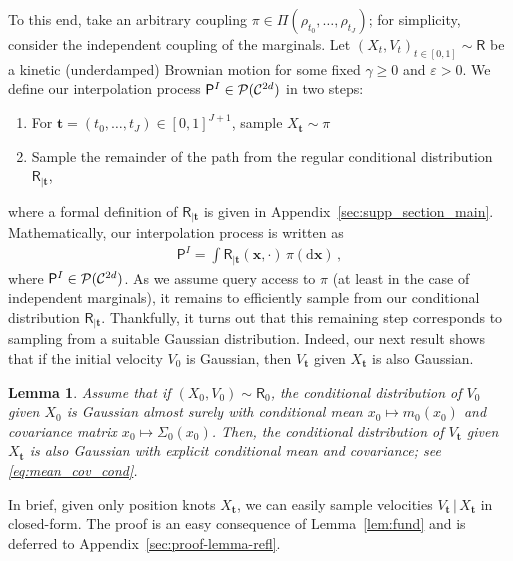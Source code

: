 \documentclass[12pt]{article}
\theoremstyle{plain}
\theoremstyle{plain}
\newtheorem{lem}{Lemma}
\theoremstyle{remark}
\newcommand{\cP}{\mathcal{P}}
\newcommand{\msf}[1]{\mathsf{#1}}
\newcommand{\ccint}[1]{\left[#1\right]}
\newcommand{\rmd}{\mathrm{d}}
\newcommand{\1}{\bm{1}}
\theoremstyle{plain}
\theoremstyle{definition}
\theoremstyle{remark}
\begin{document}
To this end, take an arbitrary coupling $\pi \in \Pi(\rho_{t_0},\ldots,\rho_{t_J})$; for simplicity, consider the independent coupling of the marginals. Let $(X_t,V_t)_{t\in\ccint{0,1}} \sim \msf R$ be a kinetic (underdamped) Brownian motion for some fixed $\gamma \geq 0$ and $\varepsilon >0$. We define our interpolation process $\mathsf P^I \in \cP({\cal C}^{2d})$ in two steps:
\begin{enumerate}
    \item For $\bm{t} = (t_0,\ldots,t_J) \in [0,1]^{J+1}$, sample $X_{\bm t}  \sim \pi$
    \item Sample the remainder of the path from the regular conditional distribution $\mathsf R_{|\bm t}$,
\end{enumerate}
where a formal definition of $\msf R_{|\bm t}$ is given in Appendix~\ref{sec:supp_section_main}. Mathematically, our interpolation process is written as
\begin{align}\label{eq:interp-process}
    {\msf P}^I = \int \msf R_{|\bm t}(\bm x,\cdot)\,\pi(\rmd \bm x)\,,
\end{align}
where $\msf P^I \in {\cal P}({\cal C}^{2d})$. As we assume query access to $\pi$ (at least in the case of independent marginals), it remains to efficiently  sample from our conditional distribution $\msf R_{|\bm t}$. Thankfully, it turns out that this remaining step corresponds to sampling from a suitable Gaussian distribution. Indeed, our next result shows that if the initial velocity $V_0$ is Gaussian, then $V_{\bm t}$ given $X_{\bm t}$ is also Gaussian.
\begin{lem}
  \label{lem:condi_v_t}
    Assume that if $(X_0,V_0) \sim \msf R_0$, the conditional distribution of $V_0$ given $X_0$ is Gaussian almost surely with conditional mean $x_0 \mapsto m_0(x_0)$ and covariance matrix $x_0 \mapsto \Sigma_0(x_0)$. Then, the conditional distribution of $V_{\bm t}$ given $X_{\bm t}$ is also Gaussian with explicit conditional mean and covariance; see \eqref{eq:mean_cov_cond}.
\end{lem}
In brief, given only position knots $X_{\bm t}$, we can easily sample velocities $V_{\bm t}\,|\, X_{\bm t}$ in closed-form. The proof is an easy consequence of Lemma~\ref{lem:fund} and is deferred to Appendix~\ref{sec:proof-lemma-refl}.
\end{document}
